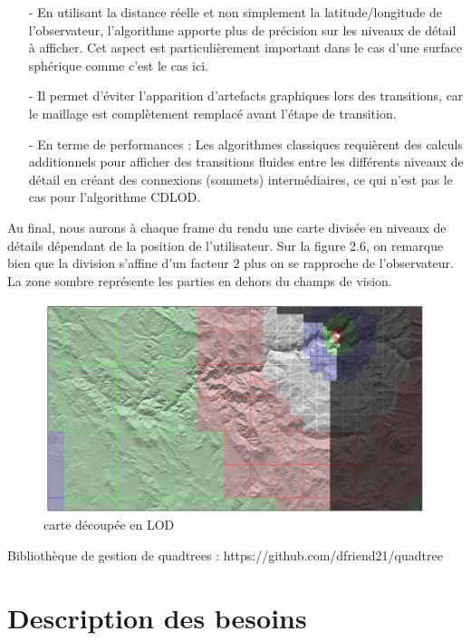 \documentclass[12pt]{report}
\begin{document}
\begin{itemize}
    \item[-] En utilisant la distance réelle et non simplement la latitude/longitude de l'observateur, l'algorithme apporte plus de précision sur les niveaux de détail à afficher. Cet aspect est particulièrement important dans le cas d'une surface sphérique comme c'est le cas ici.
    \item[-] Il permet d'éviter l'apparition d'artefacts graphiques lors des transitions, car le maillage est complètement remplacé avant l'étape de transition.
    \item[-] En terme de performances : Les algorithmes classiques requièrent des calculs additionnels pour afficher des transitions fluides entre les différents niveaux de détail en créant des connexions (sommets) intermédiaires, ce qui n'est pas le cas pour l'algorithme CDLOD.
\end{itemize}

Au final, nous aurons à chaque frame du rendu une carte divisée en niveaux de détails dépendant de la position de l'utilisateur. Sur la figure 2.6, on remarque bien que la division s'affine d'un facteur 2 plus on se rapproche de l'observateur. La zone sombre représente les parties en dehors du champs de vision. 

\vspace{0.3cm}

\begin{figure}[h]
\centering
\includegraphics[scale = 0.6]{images/CDLOD2.PNG}
\caption{carte découpée en LOD}
\end{figure}


Bibliothèque de gestion de quadtrees : https://github.com/dfriend21/quadtree

\newpage

\chapter{Description des besoins}
\end{document}
